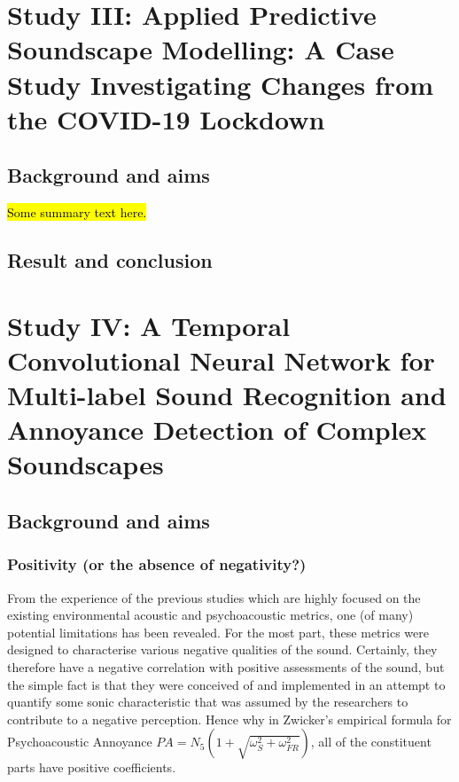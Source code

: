 \documentclass[twoside,fontsize=12pt,titlepage]{scrbook}
\begin{document}
\section{Study III: Applied Predictive Soundscape Modelling: A Case Study Investigating Changes from the COVID-19 Lockdown}

 \subsection*{Background and aims}
       \hl{Some summary text here.}

 \subsection*{Result and conclusion}

 



       \newpage
\section{Study IV: A Temporal Convolutional Neural Network for Multi-label Sound Recognition and Annoyance Detection of Complex Soundscapes}

 \subsection*{Background and aims}

       \subsubsection*{Positivity (or the absence of negativity?)}
             From the experience of the previous studies which are highly focused on the existing environmental acoustic and psychoacoustic metrics, one (of many) potential limitations has been revealed. For the most part, these metrics were designed to characterise various negative qualities of the sound. Certainly, they therefore have a negative correlation with positive assessments of the sound, but the simple fact is that they were conceived of and implemented in an attempt to quantify some sonic characteristic that was assumed by the researchers to contribute to a negative perception. Hence why in Zwicker's empirical formula for Psychoacoustic Annoyance \citep{PsychoacousticsfactsmodelsZwicker} $PA = N_5 (1 + \sqrt{\omega^2_S + \omega^2_{FR}})$, all of the constituent parts have positive coefficients.
\end{document}
